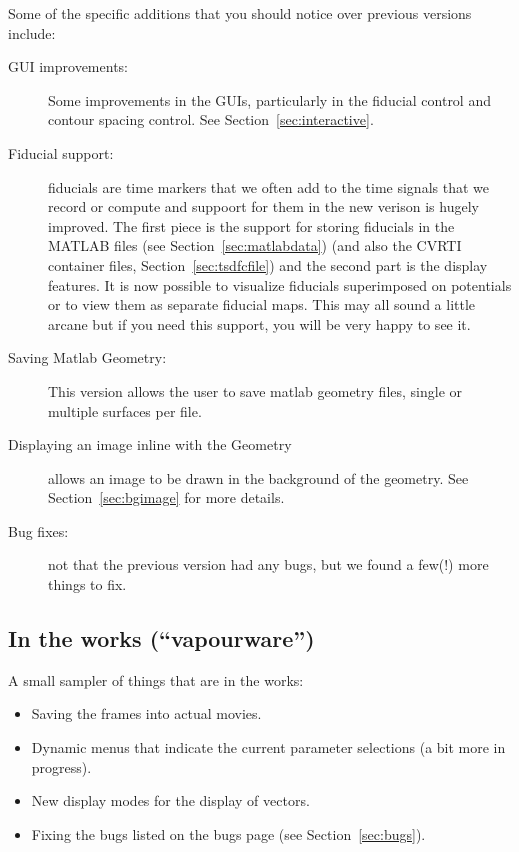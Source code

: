 Some of the specific additions that you should notice over previous versions
include:
%
\begin{description}
  \item [GUI improvements: ] Some improvements in the GUIs, particularly in the
    fiducial control and contour spacing control.  See 
    Section~\ref{sec:interactive}.
  \item[Fiducial support:] fiducials are time markers that we often add to
    the time signals that we record or compute and suppoort for them in the
    new verison is hugely improved.  The first piece is the support for
    storing fiducials in the MATLAB files (see
    Section~\ref{sec:matlabdata}) (and also the CVRTI container files,
    Section~\ref{sec:tsdfcfile}) and the second part is the display features.
    It is now possible to visualize fiducials superimposed on potentials or
    to view them as separate fiducial maps.  This may all sound a little
    arcane but if you need this support, you will be very happy to see it.
  \item [Saving Matlab Geometry: ] This version allows the user to save matlab 
    geometry files, single or multiple surfaces per file.
  \item [Displaying an image inline with the Geometry] \map{} allows an
    image to be drawn in the background of the geometry.  See
    Section~\ref{sec:bgimage} for more details.
  \item [Bug fixes: ] not that the previous version had any bugs, but we
    found a few(!) more things to fix.
\end{description}

\subsection{In the works (``vapourware'')}
\label{sec:vapourware}

A small sampler of things that are in the works:

\begin{itemize}
  \item Saving the frames into actual movies.
  \item Dynamic menus that indicate the current parameter selections
    (a bit more in progress).
  \item New display modes for the display of vectors.
  \item Fixing the bugs listed on the bugs page (see
    Section~\ref{sec:bugs}).
\end{itemize}



